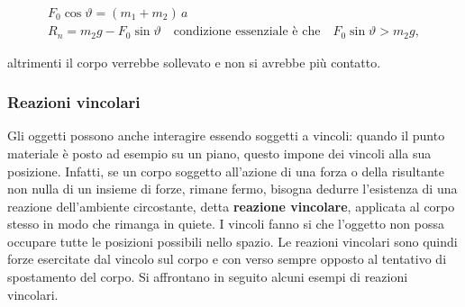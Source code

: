 \begin{figure}[htpb]
\end{figure}

\begin{gather*}
	F_0\cos\vartheta=(m_1+m_2)\,a \\
	R_n=m_2 g-F_0\sin\vartheta \quad \text{condizione essenziale è che} \quad F_0\sin\vartheta>m_2 g,
\end{gather*}

altrimenti il corpo verrebbe sollevato e non si avrebbe più contatto.

\subsubsection{Reazioni vincolari}

Gli oggetti possono anche interagire essendo soggetti a vincoli: quando il punto materiale è posto ad esempio su un piano, questo impone dei vincoli alla sua posizione. Infatti, se un corpo soggetto all'azione di una forza o della risultante non nulla di un insieme di forze, rimane fermo, bisogna dedurre l'esistenza di una reazione dell'ambiente circostante, detta \textbf{reazione vincolare}, applicata al corpo stesso in modo che rimanga in quiete. I vincoli fanno si che l'oggetto non possa occupare tutte le posizioni possibili nello spazio. Le reazioni vincolari sono quindi forze esercitate dal vincolo sul corpo e con verso sempre opposto al tentativo di spostamento del corpo. Si affrontano in seguito alcuni esempi di reazioni vincolari.

